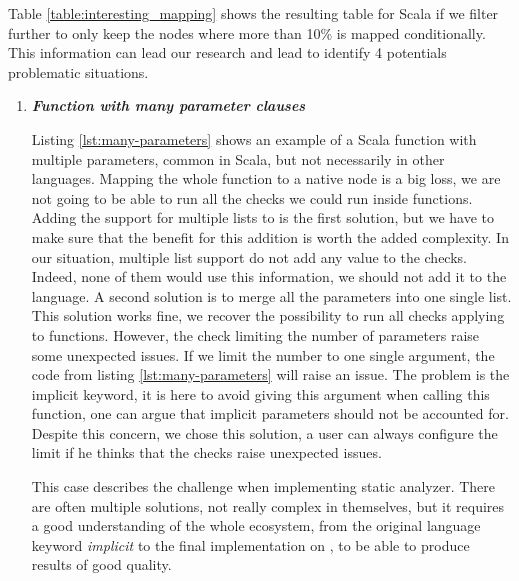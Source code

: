 Table \ref{table:interesting_mapping} shows the resulting table for Scala if we filter further to only keep the nodes where more than 10\% is mapped conditionally. 
This information can lead our research and lead to identify 4 potentials problematic situations.

\begin{enumerate}
	\item \textbf{\textit{Function with many parameter clauses}} \newline 
	
	
	Listing \ref{lst:many-parameters} shows an example of a Scala function with multiple parameters, common in Scala, but not necessarily in other languages. 
	Mapping the whole function to a native node is a big loss, we are not going to be able to run all the checks we could run inside functions.
	Adding the support for multiple lists to \slang{} is the first solution, but we have to make sure  that the benefit for this addition is worth the added complexity.
	In our situation, multiple list support do not add any value to the checks.
	Indeed, none of them would use this information, we should not add it to the language.
	A second solution is to merge all the parameters into one single list.
	This solution works fine, we recover the possibility to run all checks applying to functions.
	However, the check limiting the number of parameters raise some unexpected issues.
	If we limit the number to one single argument, the code from listing \ref{lst:many-parameters} will raise an issue.
	The problem is the implicit keyword, it is here to avoid giving this argument when calling this function, one can argue that implicit parameters should not be accounted for.
	Despite this concern, we chose this solution, a user can always configure the limit if he thinks that the checks raise unexpected issues.
	
	This case describes the challenge when implementing static analyzer.
	There are often multiple solutions, not really complex in themselves, but it requires a good understanding of the whole ecosystem, from the original language keyword \emph{implicit} to the final implementation on \slang{}, to be able to produce results of good quality.
	

\end{enumerate}
